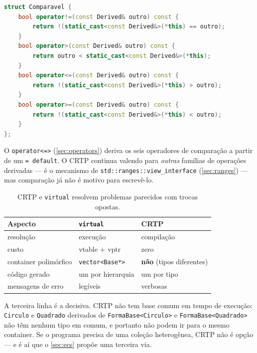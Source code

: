 \begin{lstlisting}[style=bt, language=C++,
    caption={Um \emph{mixin} de comparação, em
             \texttt{src/templates/demo\_crtp.hpp}.}]
struct Comparavel {
    bool operator!=(const Derived& outro) const {
        return !(static_cast<const Derived&>(*this) == outro);
    }
    bool operator>(const Derived& outro) const {
        return outro < static_cast<const Derived&>(*this);
    }
    bool operator<=(const Derived& outro) const {
        return !(static_cast<const Derived&>(*this) > outro);
    }
    bool operator>=(const Derived& outro) const {
        return !(static_cast<const Derived&>(*this) < outro);
    }
};
\end{lstlisting}

\begin{regra}
O \texttt{operator<=>} (\cref{sec:operators}) deriva os seis operadores de
comparação a partir de um \texttt{= default}. O CRTP continua valendo para
\emph{outras} famílias de operações derivadas --- é o mecanismo de
\texttt{std::ranges::view\_interface} (\cref{sec:ranges}) --- mas comparação já
não é motivo para escrevê-lo.
\end{regra}

\begin{table}[htbp]
\centering
\caption{CRTP e \texttt{virtual} resolvem problemas parecidos com trocas opostas.}
\label{tab:crtp-virtual}
\footnotesize
\begin{tabular}{@{}lll@{}}
\toprule
\textbf{Aspecto} & \texttt{virtual} & \textbf{CRTP} \\
\midrule
resolução                 & execução        & compilação \\
custo                     & vtable + vptr   & zero \\
container polimórfico     & \texttt{vector<Base*>} & \textbf{não} (tipos diferentes) \\
código gerado             & um por hierarquia & um por tipo \\
mensagens de erro         & legíveis        & verbosas \\
\bottomrule
\end{tabular}
\end{table}

A terceira linha é a decisiva. CRTP não tem base comum em tempo de execução:
\texttt{Circulo} e \texttt{Quadrado} derivados de \texttt{FormaBase<Circulo>} e
\texttt{FormaBase<Quadrado>} não têm nenhum tipo em comum, e portanto não podem
ir para o mesmo container. Se o programa precisa de uma coleção heterogênea,
CRTP não é opção --- e é aí que o \cref{sec:ecs} propõe uma terceira via.

